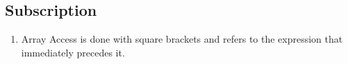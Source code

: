 \subsection{Subscription}

\begin{enumerate}
\item Array Access is done with square brackets and refers to the expression that immediately precedes it.
\end{enumerate}